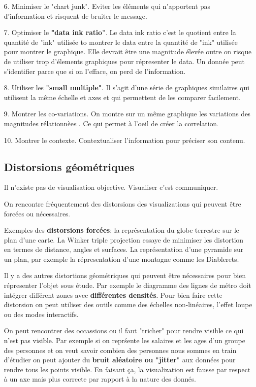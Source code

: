 6. Minimiser le "chart junk". Eviter les \'el\'ements qui n'apportent pas d'information et risquent de bruiter le message.

7. Optimiser le \textbf{"data ink ratio"}. Le data ink ratio c'est le quotient entre la quantit\'e de "ink" utilis\'ee to montrer le data entre la quantit\'e de "ink" utilis\'ee pour montrer le graphique. Elle devrait \^etre une magnitude \'elev\'ee outre on risque de utiliser trop d'\'elements graphiques pour r\'epresenter le data. Un donn\'ee peut s'identifier parce que si on l'efface, on perd de l'information.

8. Utiliser les \textbf{"small multiple"}. Il s'agit d'une s\'erie de graphiques similaires qui utilisent la m\^eme \'echelle et axes et qui permettent de les comparer facilement.

9. Montrer les co-variations. On montre sur un m\^eme graphique les variations des magnitudes r\'elationn\`ees . Ce qui permet \`a l'oeil de cr\'eer la correlation.

10. Montrer le contexte. Contextualiser l'information pour pr\'eciser son contenu.

\subsection{Distorsions g\'eom\'etriques}

Il n'existe pas de visualisation objective. Visualiser c'est communiquer.

On rencontre fr\'equentement des distorsions des visualizations qui peuvent \^etre forc\'ees ou n\'ecessaires.  

Exemples des \textbf{distorsions forc\'ees}: la repr\'esentation du globe terrestre sur le plan d'une carte. La Winker triple projection essaye de minimiser les distortion en termes de distance, angles et surfaces. La repr\'esentation d'une pyramide sur un plan, par exemple la r\'epresentation d'une montagne comme les Diablerets.

Il y a des autres distortions g\'eom\'etriques qui peuvent \^etre n\'ecessaires pour bien r\'epresenter l'objet sous \'etude. Par exemple le diagramme des lignes de m\'etro doit int\'egrer diff\'erent zones avec \textbf{diff\'erentes densit\'es}. Pour bien faire cette distorsion on peut utiliser des outils comme des \'echelles non-lin\'eaires, l'effet loupe ou des modes interactifs. 

On peut rencontrer des occassions ou il faut "tricher" pour rendre visible ce qui n'est pas visible. Par exemple si on repr\'sente les salaires et les ages d'un groupe des personnes et on veut savoir combien des personnes nous sommes en train d'\'etudier on peut ajouter du \textbf{bruit al\'eatoire ou "jitter"} aux donn\'ees pour rendre tous les points visible. En faisant \c{c}a, la visualization est fausse par respect \`a un axe mais plus correcte par rapport \`a la nature des donn\'es.

